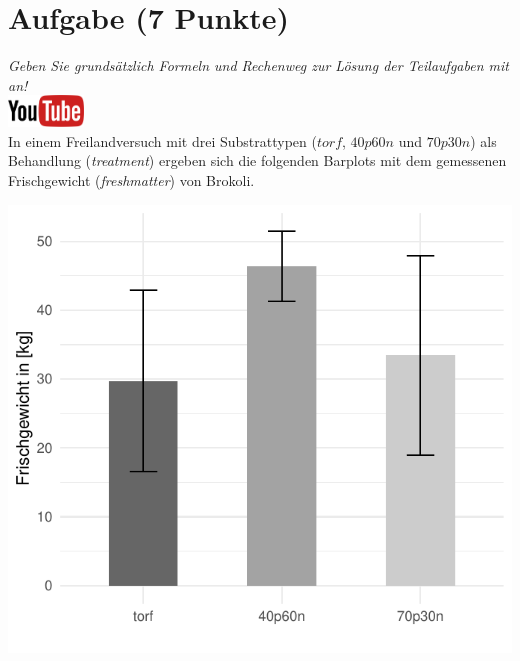\documentclass[a4paper, 9pt]{scrartcl}\usepackage[]{graphicx}\usepackage[]{xcolor}
\makeatletter
\def\maxwidth{ %
  \ifdim\Gin@nat@width>\linewidth
    \linewidth
  \else
    \Gin@nat@width
  \fi
}
\makeatother
\begin{document}
 
\clearpage

\section{Aufgabe \hfill (7 Punkte)}

\textit{Geben Sie grunds{\"a}tzlich Formeln und Rechenweg zur L{\"o}sung der
  Teilaufgaben mit an!} \\[1Ex]

\hfill\href{https://youtu.be/t0WYa_LVc5o}{\includegraphics[width = 2cm]{img/youtube}}\\[1Ex]



In einem Freilandversuch mit drei Substrattypen ($torf$, $40p60n$ und $70p30n$) als Behandlung
(\textit{treatment}) ergeben sich die folgenden Barplots mit dem
gemessenen Frischgewicht (\textit{freshmatter}) von Brokoli.




{\centering \includegraphics[width=\maxwidth]{img/barplot-02-1} 

}
\end{document}
